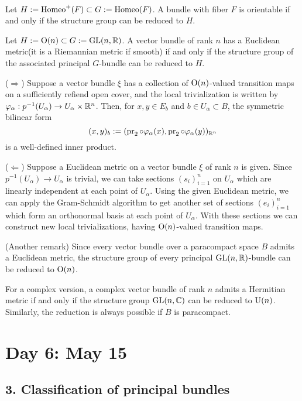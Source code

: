 \documentclass{../../small}
\begin{document}
\begin{ex*}\,
\begin{parts}
\item Let $H:=\operatorname{Homeo}^+(F)\subset G:=\operatorname{Homeo}(F)$.
A bundle with fiber $F$ is orientable if and only if the structure group can be reduced to $H$.
\item Let $H:=\mathrm{O}(n)\subset G:=\mathrm{GL}(n,\mathbb{R})$.
A vector bundle of rank $n$ has a Euclidean metric(it is a Riemannian metric if smooth) if and only if the structure group of the associated principal $G$-bundle can be reduced to $H$.

($\Rightarrow$)
Suppose a vector bundle $\xi$ has a collection of $\mathrm{O}(n)$-valued transition maps on a sufficiently refiend open cover, and the local trivialization is written by $\varphi_\alpha:p^{-1}(U_\alpha)\to U_\alpha\times\mathbb{R}^n$.
Then, for $x,y\in E_b$ and $b\in U_\alpha\subset B$, the symmetric bilinear form
\[(x,y)_b:=(\operatorname{pr}_2\circ\varphi_\alpha(x),\operatorname{pr}_2\circ\varphi_\alpha(y))_{\mathbb{R}^n}\]
is a well-defined inner product.

($\Leftarrow$)
Suppose a Euclidean metric on a vector bundle $\xi$ of rank $n$ is given.
Since $p^{-1}(U_\alpha)\to U_\alpha$ is trivial, we can take sections $(s_i)_{i=1}^n$ on $U_\alpha$ which are linearly independent at each point of $U_\alpha$.
Using the given Euclidean metric, we can apply the Gram-Schmidt algorithm to get another set of sections $(e_i)_{i=1}^n$ which form an orthonormal basis at each point of $U_\alpha$.
With these sections we can construct new local trivializations, having $\mathrm{O}(n)$-valued transition maps.

(Another remark)
Since every vector bundle over a paracompact space $B$ admits a Euclidean metric, the structure group of every principal $\mathrm{GL}(n,\mathbb{R})$-bundle can be reduced to $\mathrm{O}(n)$.

\item
For a complex version, a complex vector bundle of rank $n$ admits a Hermitian metric if and only if the structure group $\mathrm{GL}(n,\mathbb{C})$ can be reduced to $\mathrm{U}(n)$.
Similarly, the reduction is always possible if $B$ is paracompact.
\end{parts}
\end{ex*}


\newpage
\section{Day 6: May 15}

\subsection*{3. Classification of principal bundles}
\end{document}

